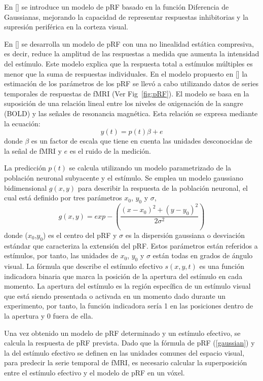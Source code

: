 En [\cite{zuiderbaan_modeling_2012}] se introduce un modelo de pRF basado en la función Diferencia de Gaussianas, mejorando la capacidad de representar respuestas inhibitorias y la supresión periférica en la corteza visual.

En [\cite{kay_compressive_2013}] se desarrolla un modelo de pRF con una no linealidad estática compresiva, es decir, reduce la amplitud de las respuestas a medida que aumenta la intensidad del estímulo. Este modelo explica que la respuesta total a estímulos múltiples es menor que la suma de respuestas individuales. En el modelo propuesto en [\cite{dumoulin_population_2008}] la estimación de los parámetros de los pRF se llevó a cabo utilizando datos de series temporales de respuestas de fMRI (Ver Fig \ref{fig:pRF}). El modelo se basa en la suposición de una relación lineal entre los niveles de oxigenación de la sangre (BOLD) y las señales de resonancia magnética. Esta relación se expresa mediante la ecuación:
\begin{equation}
	y(t)=p(t)\beta + e
\end{equation}
donde $\beta$ es un factor de escala que tiene en cuenta las unidades desconocidas de la señal de fMRI y $e$ es el ruido de la medición. 

La predicción $p(t)$ se calcula utilizando un modelo parametrizado de la población neuronal subyacente y el estímulo. Se emplea un modelo gaussiano bidimensional $g(x,y)$ para describir la respuesta de la población neuronal, el cual est\'a definido por tres par\'ametros $x_0$,  $y_0$ y $\sigma$,
\begin{equation}
	g(x,y)=exp-\left(\frac{(x-x_0)^2+(y-y_0)^2}{2\sigma^2}\right)
	\label{gaussian}
\end{equation}
donde ($x_0$,$y_0$) es el centro del pRF y $\sigma$ es la dispersión gaussiana o desviación estándar que caracteriza la extensi\'on del pRF. Estos parámetros están referidos a estímulos, por tanto, las unidades de $x_0$, $y_0$ y $\sigma$ están todas en grados de ángulo visual. La fórmula que describe el estímulo efectivo $s(x,y,t)$ es una función indicadora binaria que marca la posición de la apertura del estímulo en cada momento. La apertura del est\'imulo es la región específica de un estímulo visual que está siendo presentada o activada en un momento dado durante un experimento, por tanto, la función indicadora ser\'ia 1 en las posiciones dentro de la apertura y 0 fuera de ella.

Una vez obtenido un modelo de pRF determinado y un estímulo efectivo, se calcula la respuesta de pRF prevista. Dado que la fórmula de pRF (\ref{gaussian}) y la del estímulo efectivo se definen en las unidades comunes del espacio visual, para predecir la serie temporal de fMRI, es necesario calcular la superposición entre el estímulo efectivo y el modelo de pRF en un vóxel.

